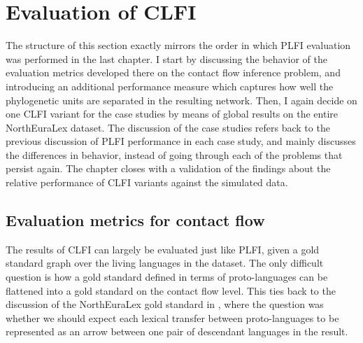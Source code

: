 \section{Evaluation of CLFI}\label{sec:7.6}
The structure of this section exactly mirrors the order in which PLFI evaluation was performed in the last chapter. I start by discussing the behavior of the evaluation metrics developed there on the contact flow inference problem, and introducing an additional performance measure which captures how well the phylogenetic units are separated in the resulting network. Then, I again decide on one CLFI variant for the case studies by means of global results on the entire NorthEuraLex dataset. The discussion of the case studies refers back to the previous discussion of PLFI performance in each case study, and mainly discusses the differences in behavior, instead of going through each of the problems that persist again. The chapter closes with a validation of the findings about the relative performance of CLFI variants against the simulated data.

\subsection{Evaluation metrics for contact flow}
The results of CLFI can largely be evaluated just like PLFI, given a gold standard graph over the living languages in the dataset. The only difficult question is how a gold standard defined in terms of proto-languages can be flattened into a gold standard on the contact flow level. This ties back to the discussion of the NorthEuraLex gold standard in , where the question was whether we should expect each lexical transfer between proto-languages to be represented as an arrow between one pair of descendant languages in the result.

